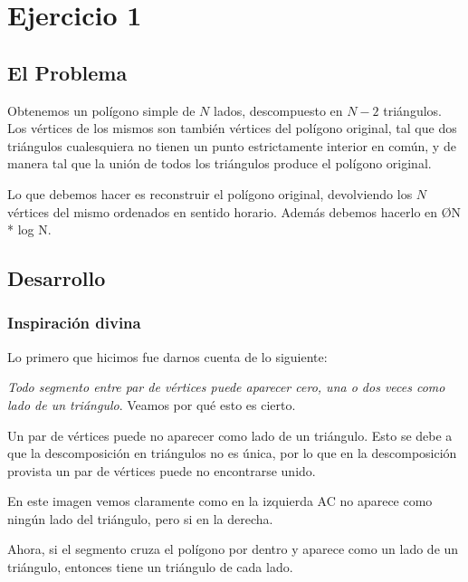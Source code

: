 \section{Ejercicio 1}
\subsection{El Problema}

Obtenemos un polígono simple de $N$ lados, descompuesto en $N - 2$ triángulos. Los vértices de los mismos son también vértices del polígono original, tal que dos triángulos cualesquiera no tienen un punto estrictamente interior en común, y de manera tal que la unión de todos los triángulos produce el polígono original.

Lo que debemos hacer es reconstruir el polígono original, devolviendo los $N$ vértices del mismo ordenados en sentido horario. Además debemos hacerlo en \O{N * log N}.

\subsection{Desarrollo}
\subsubsection{Inspiración divina}

Lo primero que hicimos fue darnos cuenta de lo siguiente:

\textit{Todo segmento entre par de vértices puede aparecer cero, una o dos veces como lado de un triángulo}. Veamos por qué esto es cierto.

Un par de vértices puede no aparecer como lado de un triángulo. Esto se debe a que la descomposición en triángulos no es única, por lo que en la descomposición provista un par de vértices puede no encontrarse unido.


En este imagen vemos claramente como en la izquierda AC no aparece como ningún lado del triángulo, pero si en la derecha.

Ahora, si el segmento cruza el polígono por dentro y aparece como un lado de un triángulo, entonces tiene un triángulo de cada lado.

